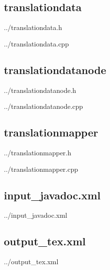  \subsection{translationdata}
 
	{../translationdata.h}
 
	{../translationdata.cpp}

 \subsection{translationdatanode}
 
	{../translationdatanode.h}
 
	{../translationdatanode.cpp}

 \subsection{translationmapper}
 
	{../translationmapper.h}
 
	{../translationmapper.cpp}

 \subsection{input\_javadoc.xml}
 
	{../input_javadoc.xml}

\subsection{output\_tex.xml}
 
	{../output_tex.xml}
